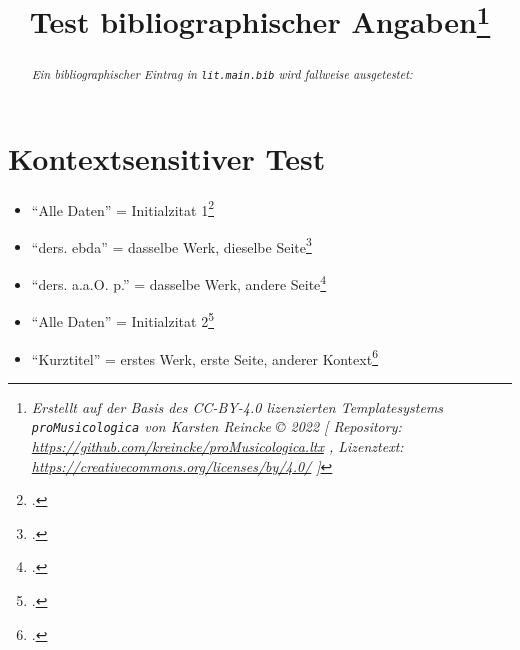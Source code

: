 \documentclass[
  DIV=calc,
  BCOR=5mm,
  11pt,
  headings=small,
  oneside,
  abstract=true,
  toc=bib,
  english,ngerman]{scrartcl}
\begin{document}
\nocite{*}

\titlehead{Bib\LaTeX}
\subject{Release 1.0}
\title{Test bibliographischer Angaben\footnote{
\textit{Erstellt auf der Basis des CC-BY-4.0 lizenzierten Templatesystems \texttt{proMusicologica} von Karsten Reincke \copyright{} 2022 [
Repository: \href{https://github.com/kreincke/proMusicologica.ltx}{https://github.com/kreincke/proMusicologica.ltx} ,
Lizenztext: \href{https://creativecommons.org/licenses/by/4.0/}{https://creativecommons.org/licenses/by/4.0/} ]}}
}


\maketitle
\begin{abstract}
\noindent \itshape
Ein bibliographischer Eintrag in \texttt{lit.main.bib} wird fallweise ausgetestet:
\end{abstract}



\section{Kontextsensitiver Test}

\begin{itemize}
  \item \enquote{Alle Daten} = Initialzitat 1\footcite[vgl.][123]{Grabner1974a}
  \item \enquote{ders. ebda} = dasselbe Werk, dieselbe Seite\footcite[vgl.][123]{Grabner1974a4}
  \item \enquote{ders. a.a.O. p.} = dasselbe Werk, andere Seite\footcite[vgl.][125f]{Grabner1974a}
  \item \enquote{Alle Daten} = Initialzitat 2\footcite[vgl.][123]{Delamotte2011a}
  \item \enquote{Kurztitel} = erstes Werk, erste Seite, anderer  Kontext\footcite[vgl.][123]{Grabner1974a}
\end{itemize}



\printnomenclature
\printbibliography
\end{document}
